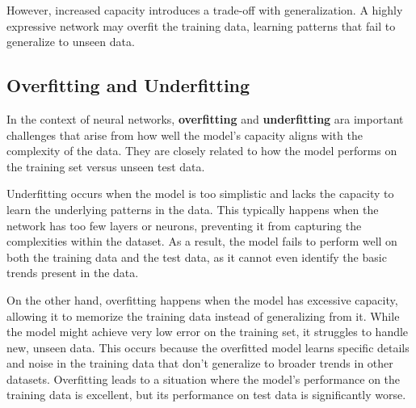 However, increased capacity introduces a trade-off with generalization. A highly expressive network may overfit the training data, learning patterns that fail to generalize to unseen data. 



\subsection{Overfitting and Underfitting}

In the context of neural networks, \textbf{overfitting} and \textbf{underfitting} ara important challenges that arise from how well the model's capacity aligns with the complexity of the data. They are closely related to how the model performs on the training set versus unseen test data.

Underfitting occurs when the model is too simplistic and lacks the capacity to learn the underlying patterns in the data. This typically happens when the network has too few layers or neurons, preventing it from capturing the complexities within the dataset. As a result, the model fails to perform well on both the training data and the test data, as it cannot even identify the basic trends present in the data.

On the other hand, overfitting happens when the model has excessive capacity, allowing it to memorize the training data instead of generalizing from it. While the model might achieve very low error on the training set, it struggles to handle new, unseen data. This occurs because the overfitted model learns specific details and noise in the training data that don't generalize to broader trends in other datasets. Overfitting leads to a situation where the model's performance on the training data is excellent, but its performance on test data is significantly worse.

